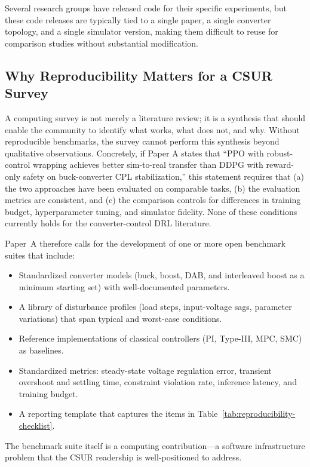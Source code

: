 \documentclass[manuscript,screen,review]{acmart}
\begin{document}
Several research groups have released code for their specific experiments, but these code releases are typically tied to a single paper, a single converter topology, and a single simulator version, making them difficult to reuse for comparison studies without substantial modification.

\subsection{Why Reproducibility Matters for a CSUR Survey}

A computing survey is not merely a literature review; it is a synthesis that should enable the community to identify what works, what does not, and why.
Without reproducible benchmarks, the survey cannot perform this synthesis beyond qualitative observations.
Concretely, if Paper A states that ``PPO with robust-control wrapping achieves better sim-to-real transfer than DDPG with reward-only safety on buck-converter CPL stabilization,'' this statement requires that (a) the two approaches have been evaluated on comparable tasks, (b) the evaluation metrics are consistent, and (c) the comparison controls for differences in training budget, hyperparameter tuning, and simulator fidelity.
None of these conditions currently holds for the converter-control DRL literature.

Paper~A therefore calls for the development of one or more open benchmark suites that include:
\begin{itemize}
  \item Standardized converter models (buck, boost, DAB, and interleaved boost as a minimum starting set) with well-documented parameters.
  \item A library of disturbance profiles (load steps, input-voltage sags, parameter variations) that span typical and worst-case conditions.
  \item Reference implementations of classical controllers (PI, Type-III, MPC, SMC) as baselines.
  \item Standardized metrics: steady-state voltage regulation error, transient overshoot and settling time, constraint violation rate, inference latency, and training budget.
  \item A reporting template that captures the items in Table~\ref{tab:reproducibility-checklist}.
\end{itemize}
The benchmark suite itself is a computing contribution---a software infrastructure problem that the CSUR readership is well-positioned to address.
\end{document}
